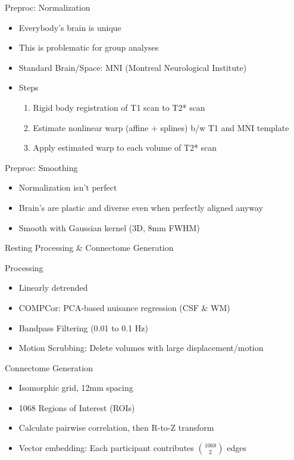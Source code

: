 \documentclass[presentation]{beamer}
\begin{document}
\begin{frame}[label={sec:orgheadline11}]{Preproc: Normalization}
\begin{itemize}
\item Everybody's brain is unique
\item This is problematic for group analyses
\item Standard Brain/Space: MNI (Montreal Neurological Institute)
\item Steps
\begin{enumerate}
\item Rigid body registration of T1 scan to T2* scan
\item Estimate nonlinear warp (affine + splines) b/w T1 and MNI template
\item Apply estimated warp to each volume of T2* scan
\end{enumerate}
\end{itemize}
\end{frame}
\begin{frame}[label={sec:orgheadline12}]{Preproc: Smoothing}
\begin{itemize}
\item Normalization isn't perfect
\item Brain's are plastic and diverse even when perfectly aligned anyway
\item Smooth with Gaussian kernel (3D, 8mm FWHM)
\end{itemize}
\end{frame}
\begin{frame}[label={sec:orgheadline13}]{Resting Processing \& Connectome Generation}
\begin{block}{Processing}
\begin{itemize}
\item Linearly detrended
\item COMPCor: PCA-based nuisance regression (CSF \& WM)
\item Bandpass Filtering (0.01 to 0.1 Hz)
\item Motion Scrubbing: Delete volumes with large displacement/motion
\end{itemize}
\end{block}
\begin{block}{Connectome Generation}
\begin{itemize}
\item Isomorphic grid, 12mm spacing
\item 1068 Regions of Interest (ROIs)
\item Calculate pairwise correlation, then R-to-Z transform
\item Vector embedding: Each participant contributes \({1068}\choose{2}\) edges
\end{itemize}
\end{block}
\end{frame}
\end{document}
